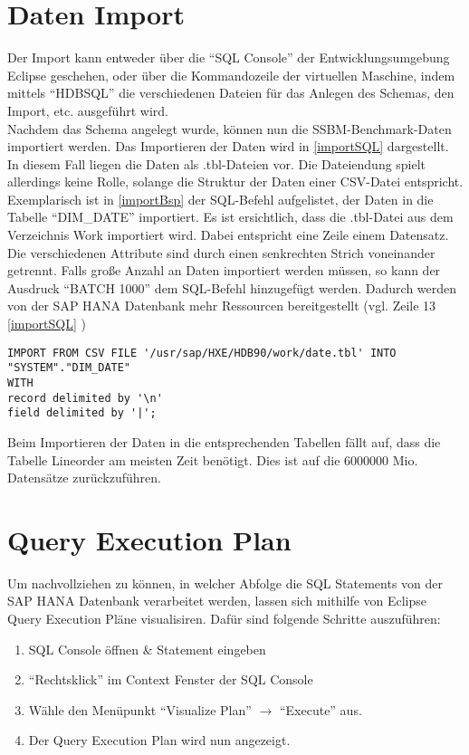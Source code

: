 \section{Daten Import}
Der Import kann entweder über die \enquote{SQL Console} der Entwicklungsumgebung Eclipse geschehen, oder über die Kommandozeile der virtuellen Maschine, indem mittels \enquote{HDBSQL} die verschiedenen Dateien für das Anlegen des Schemas, den Import, etc. ausgeführt wird.
\\Nachdem das Schema angelegt wurde, können nun die SSBM-Benchmark-Daten importiert werden. Das Importieren der Daten wird in \autoref{importSQL} dargestellt. In diesem Fall liegen die Daten als .tbl-Dateien vor. Die Dateiendung spielt allerdings keine Rolle, solange die Struktur der Daten einer CSV-Datei entspricht.
\\Exemplarisch ist in \autoref{importBsp} der SQL-Befehl aufgelistet, der Daten in die Tabelle \enquote{DIM\_DATE} importiert. Es ist ersichtlich, dass die .tbl-Datei aus dem Verzeichnis Work importiert wird. Dabei entspricht eine Zeile einem Datensatz. Die verschiedenen Attribute sind durch einen senkrechten Strich voneinander getrennt. Falls große Anzahl an Daten importiert werden müssen, so kann der Ausdruck \enquote{BATCH 1000} dem SQL-Befehl hinzugefügt werden. Dadurch werden von der SAP HANA Datenbank mehr Ressourcen bereitgestellt (vgl. Zeile 13 \autoref{importSQL} )
\begin{lstlisting}[label=importBsp, caption={Beispiel SQL-Befehl: Datenimport}]
IMPORT FROM CSV FILE '/usr/sap/HXE/HDB90/work/date.tbl' INTO "SYSTEM"."DIM_DATE" 
WITH
record delimited by '\n' 
field delimited by '|';
\end{lstlisting}

Beim Importieren der Daten in die entsprechenden Tabellen fällt auf, dass die Tabelle Lineorder am meisten Zeit benötigt. Dies ist auf die 6000000 Mio. Datensätze zurückzuführen. 


\section{Query Execution Plan}
Um nachvollziehen zu können, in welcher Abfolge die SQL Statements von der SAP HANA Datenbank verarbeitet werden, lassen sich mithilfe von Eclipse Query Execution Pläne visualisiren.
Dafür sind folgende Schritte auszuführen:
\begin{enumerate}
	\item SQL Console öffnen \& Statement eingeben
	\item \enquote{Rechtsklick} im Context Fenster der SQL Console
	\item Wähle den Menüpunkt \enquote{Visualize Plan} $\rightarrow$ \enquote{Execute} aus.
	\item Der Query Execution Plan wird nun angezeigt.
\end{enumerate} 
